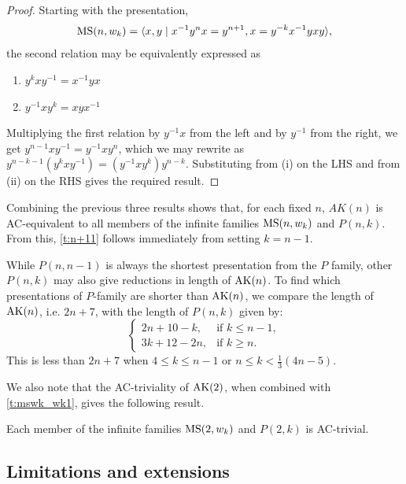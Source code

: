 \begin{proof}
    Starting with the presentation,
        \[
        \text{MS}(n, w_k) = \langle x, y \mid x^{-1} y^n x = y^{n+1}, x = y^{-k} x^{-1} y x y\rangle,
        \]
    the second relation may be equivalently expressed as 
    \begin{enumerate}[label=(\roman*)]
        \item $y^{k}xy^{-1}=x^{-1}yx$
        \item $y^{-1}xy^{k}=xyx^{-1}$
    \end{enumerate}
    Multiplying the first relation by $y^{-1} x$ from the left and by $y^{-1}$ from the right, we get $y^{n-1} x y^{-1} = y^{-1} x y^{n}$, which we may rewrite as $y^{n-k-1} \left(y^k x y^{-1}\right) = \left(y^{-1} x y^{k}\right) y^{n-k}$. Substituting from (i) on the LHS and from (ii) on the RHS gives the required result.
\end{proof}

Combining the previous three results shows that, for each fixed $n$, $AK(n)$ is AC-equivalent to all members of the infinite families $\text{MS}(n, w_k)$ and $P(n, k)$. From this, \cref{t:n+11} follows immediately from setting $k = n - 1$.

\begin{remark}
While $P(n, n-1)$ is always the shortest presentation from the $P$ family, other $P(n, k)$ may also give reductions in length of $\text{AK}(n)$. To find which presentations of $P$-family are shorter than $\text{AK}(n)$, we compare the length of $\text{AK}(n)$, i.e. $2n + 7$, with the length of $P(n, k)$ given by:
\[
    \begin{cases} 
        2n + 10 - k, & \text{if } k \leq n-1, \\
        3k + 12 - 2n, & \text{if } k \geq n.
    \end{cases}
\]
This is less than $2n+7$ when $4 \leq k \leq n-1$ or $n \leq k < \frac{1}{3} \left(4n-5 \right)$.
\end{remark}

We also note that the AC-triviality of $\text{AK}(2)$, when combined with \cref{t:mswk_wk1}, gives the following result. 
\begin{corollary}\label{c:ms2wk}
Each member of the infinite families $\text{MS}(2, w_k)$ and $P(2, k)$ is AC-trivial.
\end{corollary}



\subsection{Limitations and extensions}

